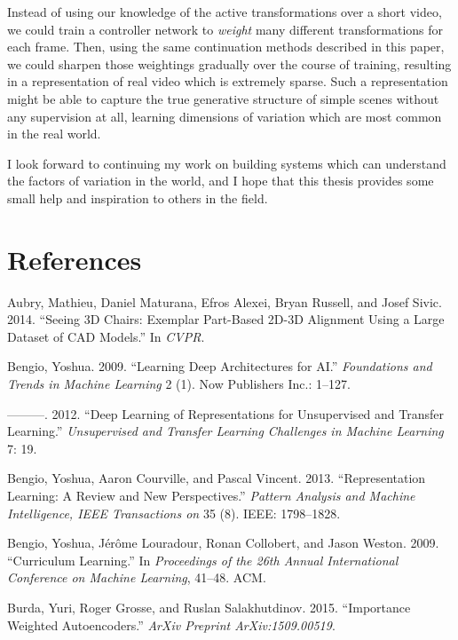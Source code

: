 \documentclass[12pt,twoside]{mitthesis}
\begin{document}
Instead of using our knowledge of the active transformations over a
short video, we could train a controller network to \emph{weight} many
different transformations for each frame. Then, using the same
continuation methods described in this paper, we could sharpen those
weightings gradually over the course of training, resulting in a
representation of real video which is extremely sparse. Such a
representation might be able to capture the true generative structure of
simple scenes without any supervision at all, learning dimensions of
variation which are most common in the real world.

I look forward to continuing my work on building systems which can
understand the factors of variation in the world, and I hope that this
thesis provides some small help and inspiration to others in the field.

\chapter*{References}\label{references}

\hypertarget{refs}{}
\hypertarget{ref-aubry2014seeing}{}
Aubry, Mathieu, Daniel Maturana, Efros Alexei, Bryan Russell, and Josef
Sivic. 2014. ``Seeing 3D Chairs: Exemplar Part-Based 2D-3D Alignment
Using a Large Dataset of CAD Models.'' In \emph{CVPR}.

\hypertarget{ref-bengio2009learning}{}
Bengio, Yoshua. 2009. ``Learning Deep Architectures for AI.''
\emph{Foundations and Trends in Machine Learning} 2 (1). Now Publishers
Inc.: 1--127.

\hypertarget{ref-bengio2012deep}{}
---------. 2012. ``Deep Learning of Representations for Unsupervised and
Transfer Learning.'' \emph{Unsupervised and Transfer Learning Challenges
in Machine Learning} 7: 19.

\hypertarget{ref-bengio2013representation}{}
Bengio, Yoshua, Aaron Courville, and Pascal Vincent. 2013.
``Representation Learning: A Review and New Perspectives.''
\emph{Pattern Analysis and Machine Intelligence, IEEE Transactions on}
35 (8). IEEE: 1798--1828.

\hypertarget{ref-bengio2009curriculum}{}
Bengio, Yoshua, Jérôme Louradour, Ronan Collobert, and Jason Weston.
2009. ``Curriculum Learning.'' In \emph{Proceedings of the 26th Annual
International Conference on Machine Learning}, 41--48. ACM.

\hypertarget{ref-burda2015importance}{}
Burda, Yuri, Roger Grosse, and Ruslan Salakhutdinov. 2015. ``Importance
Weighted Autoencoders.'' \emph{ArXiv Preprint ArXiv:1509.00519}.
\end{document}
